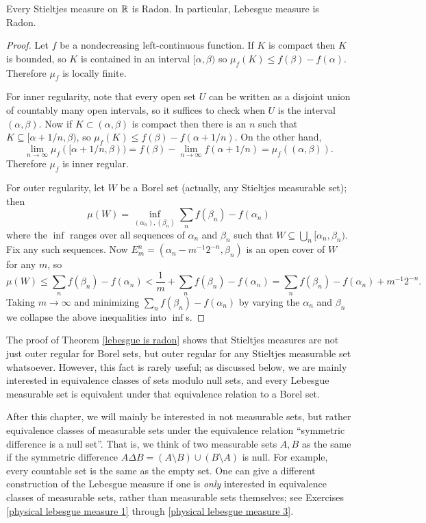 \begin{theorem}
\label{lebesgue is radon}
Every Stieltjes measure on $\mathbb{R}$ is Radon.
In particular, Lebesgue measure is Radon.
\end{theorem}
\begin{proof}
Let $f$ be a nondecreasing left-continuous function.
If $K$ is compact then $K$ is bounded, so $K$ is contained in an interval $[\alpha, \beta)$ so $\mu_f(K) \leq f(\beta) - f(\alpha)$.
Therefore $\mu_f$ is locally finite.

For inner regularity, note that every open set $U$ can be written as a disjoint union of countably many open intervals, so it suffices to check when $U$ is the interval $(\alpha, \beta)$.
Now if $K \subset (\alpha, \beta)$ is compact then there is an $n$ such that $K \subseteq [\alpha + 1/n, \beta)$, so $\mu_f(K) \leq f(\beta) - f(\alpha + 1/n)$.
On the other hand,
\[\lim_{n \to \infty} \mu_f([\alpha + 1/n, \beta)) = f(\beta) - \lim_{n \to \infty} f(\alpha + 1/n) = \mu_f((\alpha, \beta)).\]
Therefore $\mu_f$ is inner regular.

For outer regularity, let $W$ be a Borel set (actually, any Stieltjes measurable set); then
\[\mu(W) = \inf_{(\alpha_{n}), (\beta_{n})} \sum_{n} f(\beta_{n}) - f(\alpha_{n})\]
where the $\inf$ ranges over all sequences of $\alpha_{n}$ and $\beta_{n}$ such that $W \subseteq \bigcup_{n} [\alpha_{n}, \beta_{n})$.
Fix any such sequences.
Now $E_{m}^{n} = (\alpha_{n} - m^{-1}2^{-n}, \beta_{n})$ is an open cover of $W$ for any $m$, so
\[\mu(W) \leq \sum_{n} f(\beta_{n}) - f(\alpha_{n}) < \frac{1}{m} + \sum_{n} f(\beta_{n}) - f(\alpha_{n}) = \sum_{n} f(\beta_{n}) - f(\alpha_{n}) + m^{-1}2^{-n}.\]
Taking $m \to \infty$ and minimizing $\sum_{n} f(\beta_{n}) - f(\alpha_{n})$ by varying the $\alpha_{n}$ and $\beta_{n}$ we collapse the above inequalities into $\inf$s.
\end{proof}

\begin{subsec}
The proof of Theorem \ref{lebesgue is radon} shows that Stieltjes measures are not just outer regular for Borel sets, but outer regular for any Stieltjes measurable set whatsoever.
However, this fact is rarely useful; as discussed below, we are mainly interested in equivalence classes of sets modulo null sets, and every Lebesgue measurable set is equivalent under that equivalence relation to a Borel set.
\end{subsec}

\begin{subsec}
After this chapter, we will mainly be interested in not measurable sets, but rather equivalence classes of measurable sets under the equivalence relation ``symmetric difference is a null set''.
That is, we think of two measurable sets $A,B$ as the same if the symmetric difference $A \Delta B = (A \setminus B) \cup (B \setminus A)$ is null.
For example, every countable set is the same as the empty set.
One can give a different construction of the Lebesgue measure if one is \emph{only} interested in equivalence classes of measurable sets, rather than measurable sets themselves; see Exercises \ref{physical lebesgue measure 1} through \ref{physical lebesgue measure 3}.
\end{subsec}

